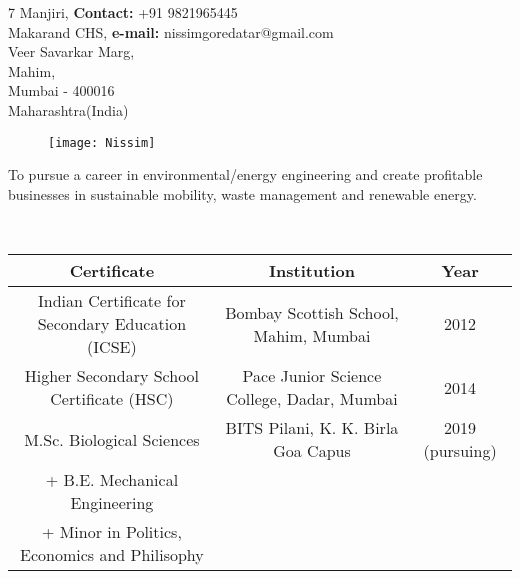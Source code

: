 \documentclass{article}
\begin{document}
	
	\hrulefill
	
	\begin{flushleft}
		7 Manjiri, 		\hspace{2.6in}    		   \textbf{Contact:}  +91  9821965445          \\
		Makarand CHS, 	\hspace{2.2in}		      \textbf{ e-mail:} nissimgoredatar@gmail.com\\
		Veer Savarkar Marg, \\
		Mahim,     \\ 
		Mumbai - 400016 \\
		Maharashtra(India)       \\
	\end{flushleft}
	
\vspace{-0.4in}

\begin{figure}[h]
	\hspace{4.5in}
	\texttt{[image: Nissim]}
\end{figure}
	
	\begin{flushleft}
		
		\vspace{0.10in}
		To pursue a career in environmental/energy engineering and create profitable businesses in sustainable mobility, waste management and renewable energy.
	
	\end{flushleft}
	
\begin{flushleft}
	\vspace{0.30in}
	\vspace{0.10in}
	\\
\begin{tabular}{|c|c|c|}
	\hline
	Certificate & Institution & Year \\ 
	\hline
	Indian Certificate for Secondary Education (ICSE) & Bombay Scottish School, Mahim, Mumbai & 2012 \\ 
	\hline
	Higher Secondary School Certificate (HSC) & Pace Junior Science College, Dadar, Mumbai & 2014 \\ 
	\hline
	M.Sc. Biological Sciences  & BITS Pilani, K. K. Birla Goa Capus & 2019 (pursuing) \\
	+ B.E. Mechanical Engineering &  &  \\
	+ Minor in Politics, Economics and Philisophy &  &  \\
	\hline
\end{tabular}

\end{flushleft} 
	
\end{document}
